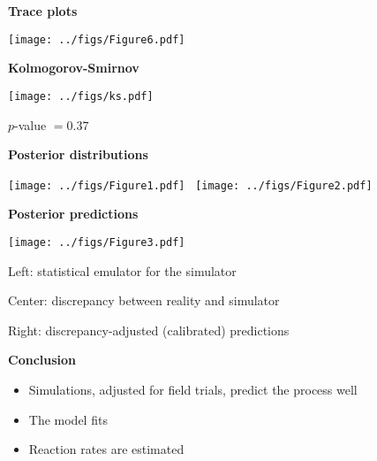 \documentclass[mathserif, 11pt, t]{beamer}
\renewcommand{\subtitle}[1]{\vspace{0.45cm}\textcolor{bluegreen}{
    {\textbf{#1}}}\vspace{0.15cm}\newline}
\begin{document}
\begin{frame}
\subtitle{Trace plots}
\begin{center}
\texttt{[image: ../figs/Figure6.pdf]}
\end{center}
\end{frame}

\begin{frame}
\subtitle{Kolmogorov-Smirnov}
\begin{center}
\texttt{[image: ../figs/ks.pdf]}

$p$-value $=0.37$
\end{center}
\end{frame}

\begin{frame}
\subtitle{Posterior distributions}
\begin{center}
\texttt{[image: ../figs/Figure1.pdf]}~
\texttt{[image: ../figs/Figure2.pdf]}
\end{center}
\end{frame}

\begin{frame}
\subtitle{Posterior predictions}
\begin{center}
\texttt{[image: ../figs/Figure3.pdf]}
\end{center}
Left: statistical emulator for the simulator

Center: discrepancy between reality and simulator

Right: discrepancy-adjusted (calibrated) predictions

\end{frame}

\begin{frame}
\subtitle{Conclusion}
\begin{itemize}[label={$\cdot$}]
\item Simulations, adjusted for field trials, predict the process well
\item The model fits
\item Reaction rates are estimated
\end{itemize}
\end{frame}
\end{document}
